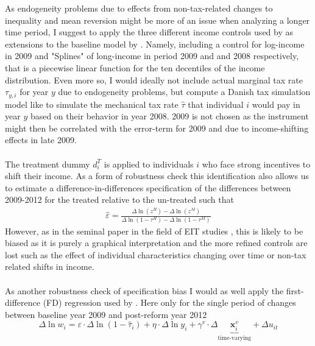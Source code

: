 As endogeneity problems due to effects from non-tax-related changes to inequality and mean reversion might be more of an issue when analyzing a longer time period, I suggest to apply the three different income controls used by \citet{kleven2014estimating} as extensions to the baseline model by \citet{kreiner2016tax}. Namely, including a control for log-income in 2009 and "Splines" of long-income in period 2009 and and 2008 respectively, that is a piecewise linear function for the ten decentiles of the income distribution. Even more so, I would ideally not include actual marginal tax rate $\tau_{y,i}$ for year $y$ due to endogeneity problems, but compute a Danish tax simulation model like \citet{chetty2011adjustment, kleven2014estimating} to simulate the mechanical tax rate $\hat{\tau}$ that individual $i$ would pay in year $y$ based on their behavior in year 2008. 2009 is not chosen as the instrument might then be correlated with the error-term for 2009 and due to income-shifting effects in late 2009.
\\
\\
The treatment dummy $d_i^T$ is applied to individuals $i$ who face strong incentives to shift their income. As a form of robustness check this identification also allows us to estimate a difference-in-differences specification of the differences between 2009-2012 for the treated relative to the un-treated such that
\begin{align}
  \hat{\varepsilon}=\frac{\Delta \ln(z^H) - \Delta \ln(z^M)}{\Delta \ln(1-\tau^H) - \Delta \ln(1-\tau^M)}
  \label{eq_DD}
\end{align}
However, as in the seminal paper in the field of EIT studies \citep{feldstein1995effect}, this is likely to be biased as it is purely a graphical interpretation and the more refined controls are lost such as the effect of individual characteristics changing over time or non-tax related shifts in income.
\\
\\
As another robustness check of specification bias I would as well apply the first-difference (FD) regression used by \citet{kleven2014estimating}. Here only for the single period of changes between baseline year 2009 and post-reform year 2012
\begin{equation}
  \Delta\ln w_{i} = \varepsilon\cdot\Delta\ln(1-\hat{\tau}_{i}) + \eta\cdot\Delta\ln y_{i} + %
  \gamma^v\cdot\Delta\underbrace{\bm{x}_i^v}_\text{time-varying} + \Delta u_{it}
  \label{eq_kleven}
\end{equation}
